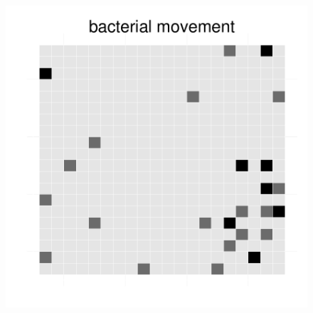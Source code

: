 \begin{figure}[h]
{\begin{minipage}[t]{0.3\textwidth}
  \end{minipage}
  \begin{minipage}[t]{0.3\textwidth}
    \includegraphics[width=\textwidth]{../results/ecoli_beijerinckii_20x20_seed5147_bac75.pdf}
  \end{minipage}
  }
\end{figure}
